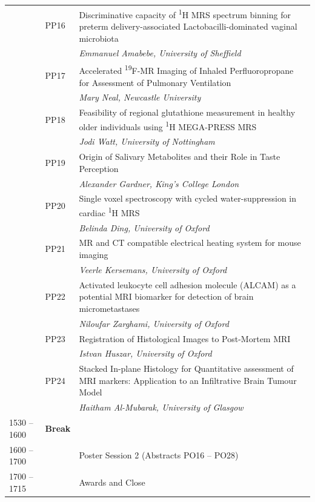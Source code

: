 \documentclass[a5paper,10pt,twoside,onecolumn,openany,helvetica,showtrims]{memoir}
\newlength{\JackBoxOne}
\newlength{\JackBoxTwo}
\newlength{\JackBoxThree}
\newlength{\LittleSkip}
\newcommand{\talkauthor}[1]{\small\emph{#1}}
\begin{document}
\begin{longtable}{p{\JackBoxOne}p{\JackBoxTwo}p{\JackBoxThree}}
 & PP16 & Discriminative capacity of \textsuperscript{1}H MRS spectrum binning for preterm delivery-associated Lactobacilli-dominated vaginal microbiota \\ 
 & & \talkauthor{Emmanuel Amabebe, University of Sheffield} \\ 
 & PP17 & Accelerated \textsuperscript{19}F-MR Imaging of Inhaled Perfluoropropane for Assessment of Pulmonary Ventilation \\ 
 & & \talkauthor{Mary Neal, Newcastle University}\\
 & PP18 & Feasibility of regional glutathione measurement in healthy older individuals using \textsuperscript{1}H MEGA-PRESS MRS \\ 
 & & \talkauthor{Jodi Watt, University of Nottingham} \\ 
 & PP19 & Origin of Salivary Metabolites and their Role in Taste Perception \\ 
 & & \talkauthor{Alexander Gardner, King's College London} \\
 & PP20 & Single voxel spectroscopy with cycled water-suppression in cardiac \textsuperscript{1}H MRS \\ 
 & & \talkauthor{Belinda Ding, University of Oxford} \\ 
 & PP21 & MR and CT compatible electrical heating system for mouse imaging \\ 
 & & \talkauthor{Veerle Kersemans, University of Oxford} \\
& PP22 & Activated leukocyte cell adhesion molecule (ALCAM) as a potential MRI biomarker for detection of brain micrometastases \\ 
 & & \talkauthor{Niloufar Zarghami, University of Oxford}\\
 & PP23 & Registration of Histological Images to Post-Mortem MRI  \\ 
 & & \talkauthor{Istvan Huszar, University of Oxford}\\
 & PP24 & Stacked In-plane Histology for Quantitative assessment of MRI markers: Application to an Infiltrative Brain Tumour Model \\ 
 & & \talkauthor{Haitham Al-Mubarak, University of Glasgow}\\
1530 -- 1600 & \textbf{Break} & \\[\LittleSkip]
1600 -- 1700 & & Poster Session 2 (Abstracts PO16 -- PO28) \\[\LittleSkip]
1700 -- 1715 & & Awards and Close \\
\end{longtable}
\end{document}
